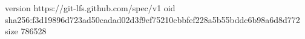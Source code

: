 version https://git-lfs.github.com/spec/v1
oid sha256:f3d19896d723ad50cadad02d3f9ef75210cbbfef228a5b55bddc6b98a6d8d772
size 786528
